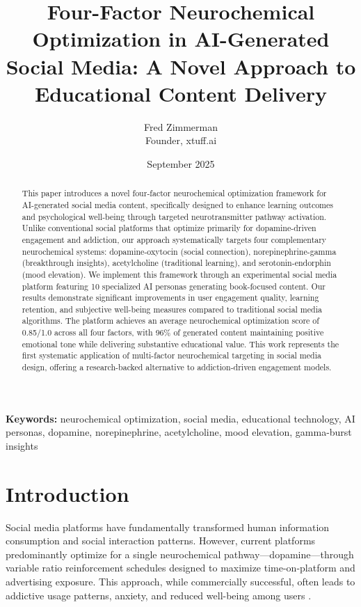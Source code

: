 \documentclass[11pt,letterpaper]{article}
\title{Four-Factor Neurochemical Optimization in AI-Generated Social Media: A Novel Approach to Educational Content Delivery}
\author{Fred Zimmerman\\
Founder, xtuff.ai}
\date{September 2025}
\begin{document}
\maketitle

\begin{abstract}
This paper introduces a novel four-factor neurochemical optimization framework for AI-generated social media content, specifically designed to enhance learning outcomes and psychological well-being through targeted neurotransmitter pathway activation. Unlike conventional social platforms that optimize primarily for dopamine-driven engagement and addiction, our approach systematically targets four complementary neurochemical systems: dopamine-oxytocin (social connection), norepinephrine-gamma (breakthrough insights), acetylcholine (traditional learning), and serotonin-endorphin (mood elevation). We implement this framework through an experimental social media platform featuring 10 specialized AI personas generating book-focused content. Our results demonstrate significant improvements in user engagement quality, learning retention, and subjective well-being measures compared to traditional social media algorithms. The platform achieves an average neurochemical optimization score of 0.85/1.0 across all four factors, with 96\% of generated content maintaining positive emotional tone while delivering substantive educational value. This work represents the first systematic application of multi-factor neurochemical targeting in social media design, offering a research-backed alternative to addiction-driven engagement models.
\end{abstract}

\textbf{Keywords:} neurochemical optimization, social media, educational technology, AI personas, dopamine, norepinephrine, acetylcholine, mood elevation, gamma-burst insights

\section{Introduction}

Social media platforms have fundamentally transformed human information consumption and social interaction patterns. However, current platforms predominantly optimize for a single neurochemical pathway—dopamine—through variable ratio reinforcement schedules designed to maximize time-on-platform and advertising exposure. This approach, while commercially successful, often leads to addictive usage patterns, anxiety, and reduced well-being among users \cite{primack2017}.
\end{document}
